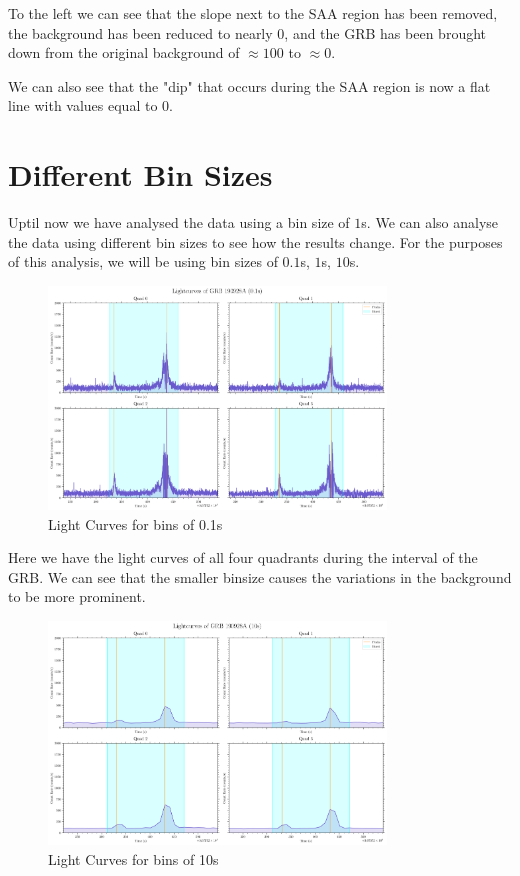 \documentclass[11pt]{book} %
\begin{document}
To the left we can see that the slope next to the SAA region has been removed, the background has been reduced to nearly $0$, and the GRB has been brought down from the original background of $\approx 100$ to $\approx 0$.

We can also see that the "dip" that occurs during the SAA region is now a flat line with values equal to $0$.

\clearpage

\section{Different Bin Sizes}

Uptil now we have analysed the data using a bin size of $1$s. We can also analyse the data using different bin sizes to see how the results change. For the purposes of this analysis, we will be using bin sizes of $0.1$s, $1$s, $10$s.

\begin{figure}[H]
    \centering
    \includegraphics[width=0.8\textwidth]{Pictures/allquads01s.png}
    \caption{Light Curves for bins of 0.1s}
    \label{fig:smallbins}
\end{figure}

Here we have the light curves of all four quadrants during the interval of the GRB. We can see that the smaller binsize causes the variations in the background to be more prominent. 

\begin{figure}[H]
    \centering
    \includegraphics[width=0.8\textwidth]{Pictures/allquads10s.png}
    \caption{Light Curves for bins of 10s}
\end{figure}
\end{document}
